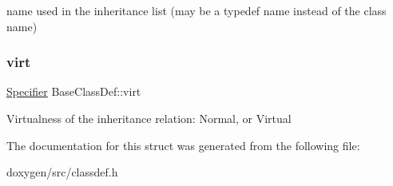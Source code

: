 name used in the inheritance list (may be a typedef name instead of the class name) \mbox{\label{struct_base_class_def_a844100c6fcd90233e01e52fc92107464}} 
\subsubsection{\texorpdfstring{virt}{virt}}
{\footnotesize\ttfamily \mbox{\hyperlink{types_8h_ab16236bdd10ddf4d73a9847350f0017e}{Specifier}} Base\+Class\+Def\+::virt}

Virtualness of the inheritance relation\+: Normal, or Virtual 

The documentation for this struct was generated from the following file\+:\begin{DoxyCompactItemize}
\item 
doxygen/src/classdef.\+h\end{DoxyCompactItemize}
